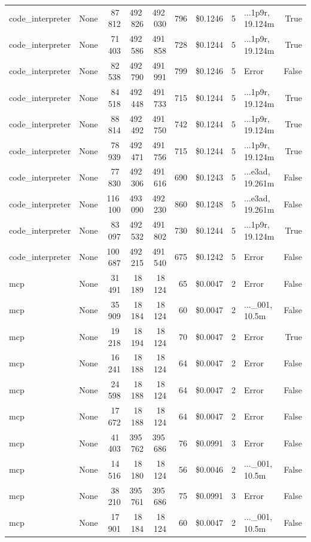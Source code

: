 \documentclass[a4paper,11pt]{article}
\begin{document}
\begin{table}[H]
{\begin{tabular}{l r r r r r r r l r}
code\_interpreter & None & 87\,812 & 492\,826 & 492\,030 & 796 & \$0.1246 & 5 & ...1p9r, 19.124m & True \\
code\_interpreter & None & 71\,403 & 492\,586 & 491\,858 & 728 & \$0.1244 & 5 & ...1p9r, 19.124m & True \\
code\_interpreter & None & 82\,538 & 492\,790 & 491\,991 & 799 & \$0.1246 & 5 & Error & False \\
code\_interpreter & None & 84\,518 & 492\,448 & 491\,733 & 715 & \$0.1244 & 5 & ...1p9r, 19.124m & True \\
code\_interpreter & None & 88\,814 & 492\,492 & 491\,750 & 742 & \$0.1244 & 5 & ...1p9r, 19.124m & True \\
code\_interpreter & None & 78\,939 & 492\,471 & 491\,756 & 715 & \$0.1244 & 5 & ...1p9r, 19.124m & True \\
code\_interpreter & None & 77\,830 & 492\,306 & 491\,616 & 690 & \$0.1243 & 5 & ...e3ad, 19.261m & False \\
code\_interpreter & None & 116\,100 & 493\,090 & 492\,230 & 860 & \$0.1248 & 5 & ...e3ad, 19.261m & False \\
code\_interpreter & None & 83\,097 & 492\,532 & 491\,802 & 730 & \$0.1244 & 5 & ...1p9r, 19.124m & True \\
code\_interpreter & None & 100\,687 & 492\,215 & 491\,540 & 675 & \$0.1242 & 5 & Error & False \\
\midrule
mcp & None & 31\,491 & 18\,189 & 18\,124 & 65 & \$0.0047 & 2 & Error & False \\
mcp & None & 35\,909 & 18\,184 & 18\,124 & 60 & \$0.0047 & 2 & ...\_001, 10.5m & False \\
mcp & None & 19\,218 & 18\,194 & 18\,124 & 70 & \$0.0047 & 2 & Error & True \\
mcp & None & 16\,241 & 18\,188 & 18\,124 & 64 & \$0.0047 & 2 & Error & False \\
mcp & None & 24\,598 & 18\,188 & 18\,124 & 64 & \$0.0047 & 2 & Error & False \\
mcp & None & 17\,672 & 18\,188 & 18\,124 & 64 & \$0.0047 & 2 & Error & False \\
mcp & None & 41\,403 & 395\,762 & 395\,686 & 76 & \$0.0991 & 3 & Error & False \\
mcp & None & 14\,516 & 18\,180 & 18\,124 & 56 & \$0.0046 & 2 & ...\_001, 10.5m & False \\
mcp & None & 38\,210 & 395\,761 & 395\,686 & 75 & \$0.0991 & 3 & Error & False \\
mcp & None & 17\,901 & 18\,184 & 18\,124 & 60 & \$0.0047 & 2 & ...\_001, 10.5m & False \\

\end{tabular}}
\end{table}
\end{document}
